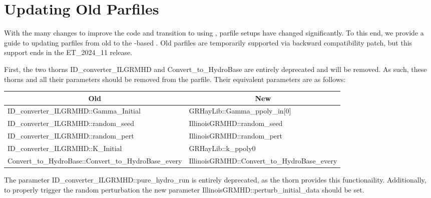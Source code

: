 \documentclass{article}
\begin{document}
\section{Updating Old Parfiles}

With the many changes to improve the code and transition to using \glib,
parfile setups have changed significantly. To this end, we provide a
guide to updating parfiles from old \igm{} to the \grhayl-based \igm.
Old parfiles are temporarily supported via backward compatibility
patch, but this support ends in the ET\_2024\_11 release.

First, the two thorns ID\_converter\_ILGRMHD and Convert\_to\_HydroBase
are entirely deprecated and will be removed. As such, these thorns and
all their parameters should be removed from the parfile. Their equivalent
parameters are as follows:
%
\begin{center}
\begin{tabular}{|l l|}
 \multicolumn{1}{|c}{Old} & \multicolumn{1}{c|}{New} \\\hline
 ID\_converter\_ILGRMHD::Gamma\_Initial & GRHayLib::Gamma\_ppoly\_in[0] \\ 
 ID\_converter\_ILGRMHD::random\_seed   & IllinoisGRMHD::random\_seed \\  
 ID\_converter\_ILGRMHD::random\_pert   & IllinoisGRMHD::random\_pert \\
 ID\_converter\_ILGRMHD::K\_Initial     & GRHayLib::k\_ppoly0 \\
 Convert\_to\_HydroBase::Convert\_to\_HydroBase\_every & IllinoisGRMHD::Convert\_to\_HydroBase\_every \\\hline
\end{tabular}
\end{center}
%
The parameter ID\_converter\_ILGRMHD::pure\_hydro\_run is entirely
deprecated, as the \ghd{} thorn provides this functionaility. Additionally,
to properly trigger the random perturbation the new parameter
IllinoisGRMHD::perturb\_initial\_data should be set.
\end{document}
